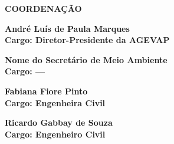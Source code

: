 \vspace{\fill}

\begin{flushright}
{\bfseries\Large\flushleft\MakeUppercase{Coordenação}}\vspace{1.5em}

	\textbf{André Luís de Paula Marques\\
	Cargo: Diretor-Presidente da AGEVAP}\vspace{1em}

\textbf{Nome do Secretário de Meio Ambiente\\
	Cargo: ---}\vspace{1em}

	\textbf{Fabiana Fiore Pinto\\
	Cargo: Engenheira Civil}\vspace{1em}

\textbf{Ricardo Gabbay de Souza\\
	Cargo: Engenheiro Civil}\vspace{1em}
\end{flushright}
\clearpage